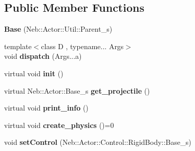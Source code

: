 \subsection*{\-Public \-Member \-Functions}
\begin{DoxyCompactItemize}
\item 
\hypertarget{classNeb_1_1Actor_1_1RigidBody_1_1Base_ae20c50935510fa8d3eee87010da087a0}{{\bfseries \-Base} (\-Neb\-::\-Actor\-::\-Util\-::\-Parent\-\_\-s)}\label{classNeb_1_1Actor_1_1RigidBody_1_1Base_ae20c50935510fa8d3eee87010da087a0}

\item 
\hypertarget{classNeb_1_1Actor_1_1RigidBody_1_1Base_a46554b7eebba2585d9cf35a19e2436ee}{{\footnotesize template$<$class D , typename... \-Args$>$ }\\void {\bfseries dispatch} (\-Args...\-a)}\label{classNeb_1_1Actor_1_1RigidBody_1_1Base_a46554b7eebba2585d9cf35a19e2436ee}

\item 
\hypertarget{classNeb_1_1Actor_1_1RigidBody_1_1Base_aca66f4b06fbefb81607559315ce6d538}{virtual void {\bfseries init} ()}\label{classNeb_1_1Actor_1_1RigidBody_1_1Base_aca66f4b06fbefb81607559315ce6d538}

\item 
\hypertarget{classNeb_1_1Actor_1_1RigidBody_1_1Base_a0813b6dcc97535d3e0fc4088561403d5}{virtual \-Neb\-::\-Actor\-::\-Base\-\_\-s {\bfseries get\-\_\-projectile} ()}\label{classNeb_1_1Actor_1_1RigidBody_1_1Base_a0813b6dcc97535d3e0fc4088561403d5}

\item 
\hypertarget{classNeb_1_1Actor_1_1RigidBody_1_1Base_a94184455c508f43845009606f70b9d7f}{virtual void {\bfseries print\-\_\-info} ()}\label{classNeb_1_1Actor_1_1RigidBody_1_1Base_a94184455c508f43845009606f70b9d7f}

\item 
\hypertarget{classNeb_1_1Actor_1_1RigidBody_1_1Base_a8c59f06c4487432769c93566f01b81dd}{virtual void {\bfseries create\-\_\-physics} ()=0}\label{classNeb_1_1Actor_1_1RigidBody_1_1Base_a8c59f06c4487432769c93566f01b81dd}

\item 
\hypertarget{classNeb_1_1Actor_1_1RigidBody_1_1Base_a13dd372df1d14fb3d8502d8b4c7a9528}{void {\bfseries set\-Control} (\-Neb\-::\-Actor\-::\-Control\-::\-Rigid\-Body\-::\-Base\-\_\-s)}\label{classNeb_1_1Actor_1_1RigidBody_1_1Base_a13dd372df1d14fb3d8502d8b4c7a9528}

\end{DoxyCompactItemize}
